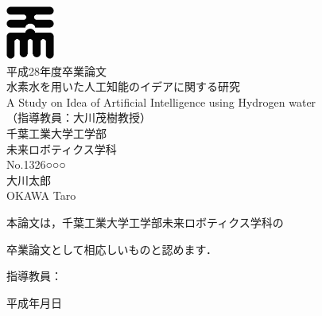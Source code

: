 \begin{center}
  \thispagestyle{empty}
  \includegraphics[clip,width=1.6cm,height=1.8cm]{cover/cit001.eps}\\
  \Large 平成28年度\quad 卒業論文\\
  \vspace{1.6cm}
  \gt \Huge 水素水を用いた人工知能のイデアに関する研究\\
  A Study on Idea of Artificial Intelligence using Hydrogen water\\
  \vspace{1.0cm}
  \mc \large  （指導教員：大川茂樹教授）\\
  \vspace{3.0cm}
  \gt \Large 千葉工業大学\quad 工学部\\
  \smallskip
  未来ロボティクス学科\\
  \vspace{0.5cm}
  \LARGE No.1326○○○\\
  \vspace{0.5cm}
  \Huge 大川\quad 太郎\\
  \huge OKAWA \quad Taro
\end{center}
\clearpage
\thispagestyle{empty}
\vspace*{2.4cm}

{\LARGE 本論文は，千葉工業大学工学部未来ロボティクス学科の}

\vspace{0.5cm}

{\LARGE 卒業論文として相応しいものと認めます．}\\

\vspace{9cm}

\begin{flushright}
{\LARGE 指導教員：\underline{\hspace{90mm}}}
\end{flushright}

\vspace{0.8cm}

\begin{flushright}
{\LARGE 平成\hspace{1.5cm}年\hspace{1.5cm}月\hspace{1.5cm}日}
\end{flushright}
